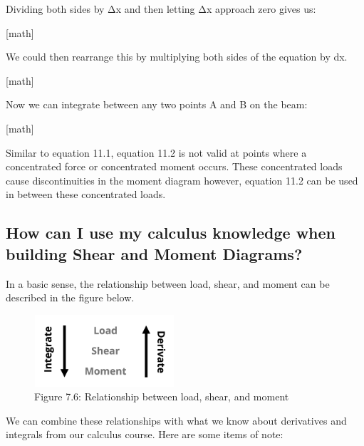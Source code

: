 \documentclass[
  letterpaper,
  DIV=11,
  numbers=noendperiod]{scrreprt}
\begin{document}
Dividing both sides by Δx and then letting Δx approach zero gives us:

{[}math{]}

We could then rearrange this by multiplying both sides of the equation
by dx.

{[}math{]}

Now we can integrate between any two points A and B on the beam:

{[}math{]}

Similar to equation 11.1, equation 11.2 is not valid at points where a
concentrated force or concentrated moment occurs. These concentrated
loads cause discontinuities in the moment diagram however, equation 11.2
can be used in between these concentrated loads.

\subsection{How can I use my calculus knowledge when building Shear and
Moment
Diagrams?}\label{how-can-i-use-my-calculus-knowledge-when-building-shear-and-moment-diagrams}

In a basic sense, the relationship between load, shear, and moment can
be described in the figure below.

\begin{figure}[H]

{\centering \includegraphics[width=2.05208in,height=1.05208in]{images/CH7 PNGs/figure 5.6.png}

}

\caption{Figure 7.6: Relationship between load, shear, and moment}

\end{figure}%

We can combine these relationships with what we know about derivatives
and integrals from our calculus course. Here are some items of note:
\end{document}

